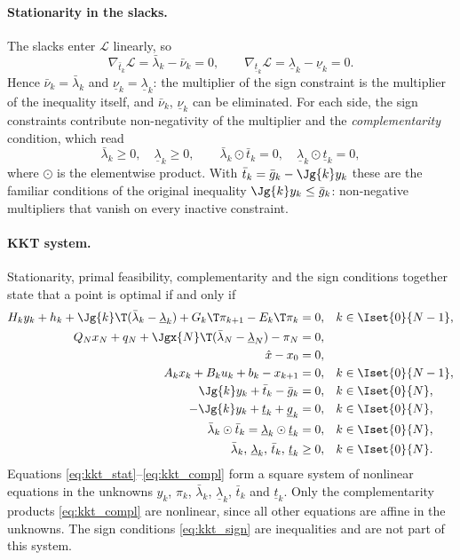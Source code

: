 \paragraph{Stationarity in the slacks.}
The slacks enter $\mathcal{L}$ linearly, so
\[
    \nabla_{\bar{t}_k}\mathcal{L} = \bar{\lambda}_k - \bar{\nu}_k = 0 ,
    \qquad
    \nabla_{\underline{t}_k}\mathcal{L} = \underline{\lambda}_k - \underline{\nu}_k = 0 .
\]
Hence $\bar{\nu}_k = \bar{\lambda}_k$ and $\underline{\nu}_k = \underline{\lambda}_k$:
the multiplier of the sign constraint is the multiplier of the inequality itself, and $\bar{\nu}_k$, $\underline{\nu}_k$ can be eliminated.
For each side, the sign constraints contribute non-negativity of the multiplier and the \textit{complementarity} condition, which read
\[
    \bar{\lambda}_k \geq 0,\quad \underline{\lambda}_k \geq 0,\qquad
    \bar{\lambda}_k \odot \bar{t}_k = 0,\quad \underline{\lambda}_k \odot \underline{t}_k = 0 ,
\]
where $\odot$ is the elementwise product.
With $\bar{t}_k = \bar{g}_k - \Jg{k} y_k$ these are the familiar conditions of the original inequality $\Jg{k} y_k \leq \bar{g}_k$:
non-negative multipliers that vanish on every inactive constraint.

\paragraph{KKT system.}
Stationarity, primal feasibility, complementarity and the sign conditions together state that a point is optimal if and only if
\begin{subequations}\label{eq:kkt}
\begin{align}
    H_k y_k + h_k + \Jg{k}\T(\bar{\lambda}_k - \underline{\lambda}_k) + G_k\T \pi_{k+1} - E_k\T \pi_k &= 0, && k\in\Iset{0}{N-1}, \label{eq:kkt_stat}\\
    Q_N x_N + q_N + \Jgx{N}\T(\bar{\lambda}_N - \underline{\lambda}_N) - \pi_N &= 0, && \label{eq:kkt_stat_N}\\
    \hat{x} - x_0 &= 0, && \label{eq:kkt_init}\\
    A_k x_k + B_k u_k + b_k - x_{k+1} &= 0, && k\in\Iset{0}{N-1}, \label{eq:kkt_dyn}\\
    \Jg{k} y_k + \bar{t}_k - \bar{g}_k &= 0, && k\in\Iset{0}{N}, \label{eq:kkt_slack_up}\\
    -\Jg{k} y_k + \underline{t}_k + \underline{g}_k &= 0, && k\in\Iset{0}{N}, \label{eq:kkt_slack_lo}\\
    \bar{\lambda}_k \odot \bar{t}_k = \underline{\lambda}_k \odot \underline{t}_k &= 0, && k\in\Iset{0}{N}, \label{eq:kkt_compl}\\
    \bar{\lambda}_k,\, \underline{\lambda}_k,\, \bar{t}_k,\, \underline{t}_k &\geq 0, && k\in\Iset{0}{N}. \label{eq:kkt_sign}
\end{align}
\end{subequations}
Equations \eqref{eq:kkt_stat}--\eqref{eq:kkt_compl} form a square system of nonlinear equations in the unknowns $y_k$, $\pi_k$, $\bar{\lambda}_k$, $\underline{\lambda}_k$, $\bar{t}_k$ and $\underline{t}_k$.
Only the complementarity products \eqref{eq:kkt_compl} are nonlinear, since all other equations are affine in the unknowns.
The sign conditions \eqref{eq:kkt_sign} are inequalities and are not part of this system.


